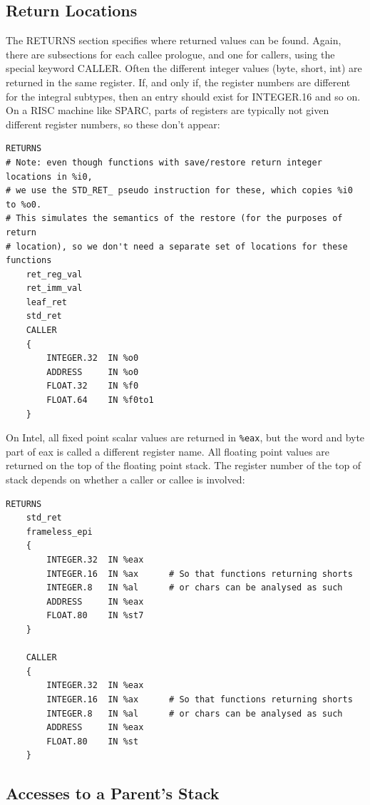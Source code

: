 \subsection{Return Locations}

The RETURNS section specifies where returned values can be found. Again,
there are subsections for each callee prologue, and one for callers, using
the special keyword CALLER. Often the different integer values (byte,
short, int) are returned in the same register. If, and only if, the register
numbers are different for the integral subtypes, then an entry should exist
for INTEGER.16 and so on. On a RISC machine like SPARC, parts of registers
are typically not given different register numbers, so these don't appear:

\begin{verbatim}
RETURNS
# Note: even though functions with save/restore return integer locations in %i0,
# we use the STD_RET_ pseudo instruction for these, which copies %i0 to %o0.
# This simulates the semantics of the restore (for the purposes of return
# location), so we don't need a separate set of locations for these functions
    ret_reg_val
    ret_imm_val
    leaf_ret
    std_ret
    CALLER
    {
        INTEGER.32  IN %o0
        ADDRESS     IN %o0
        FLOAT.32    IN %f0
        FLOAT.64    IN %f0to1
    }
\end{verbatim}

On Intel, all fixed point scalar values are returned in {\tt \%eax},
but the word and byte part of eax is called a different register name.
All floating point values are returned on the top of the floating
point stack. The register number of the top of stack depends on whether
a caller or callee is involved:

\begin{verbatim}
RETURNS
    std_ret
    frameless_epi
    {
        INTEGER.32  IN %eax
        INTEGER.16  IN %ax      # So that functions returning shorts
        INTEGER.8   IN %al      # or chars can be analysed as such
        ADDRESS     IN %eax
        FLOAT.80    IN %st7
    }

    CALLER
    {
        INTEGER.32  IN %eax
        INTEGER.16  IN %ax      # So that functions returning shorts
        INTEGER.8   IN %al      # or chars can be analysed as such
        ADDRESS     IN %eax
        FLOAT.80    IN %st
    }
\end{verbatim}

\subsection{Accesses to a Parent's Stack}

